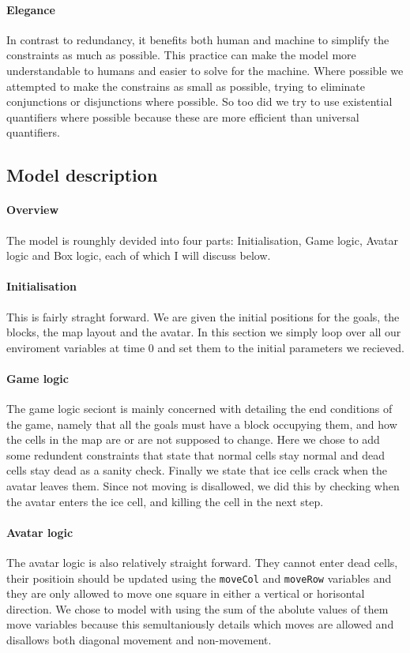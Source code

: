 \documentclass[british]{article}
\newcommand{\code}[1]{\texttt{#1}}
\begin{document}
\paragraph{Elegance} In contrast to redundancy, it benefits both human and machine to simplify the constraints as much as possible. This practice can make the model more understandable to humans and easier to solve for the machine. Where possible we attempted to make the constrains as small as possible, trying to eliminate conjunctions or disjunctions where possible. So too did we try to use existential quantifiers where possible because these are more efficient than universal quantifiers. 

\subsection{Model description}
\paragraph{Overview} The model is rounghly devided into four parts: Initialisation, Game logic, Avatar logic and Box logic, each of which I will discuss below. 

\paragraph{Initialisation} This is fairly straght forward. We are given the initial positions for the goals, the blocks, the map layout and the avatar. In this section we simply loop over all our enviroment variables at time 0 and set them to the initial parameters we recieved. 

\paragraph{Game logic} The game logic seciont is mainly concerned with detailing the end conditions of the game, namely that all the goals must have a block occupying them, and how the cells in the map are or are not supposed to change. Here we chose to add some redundent constraints that state that normal cells stay normal and dead cells stay dead as a sanity check. Finally we state that ice cells crack when the avatar leaves them. Since not moving is disallowed, we did this by checking when the avatar enters the ice cell, and killing the cell in the next step.

\paragraph{Avatar logic} The avatar logic is also relatively straight forward. They cannot enter dead cells, their positioin should be updated using the \code{moveCol} and \code{moveRow} variables and they are only allowed to move one square in either a vertical or horisontal direction. We chose to model with using the sum of the abolute values of them move variables because this semultaniously details which moves are allowed and disallows both diagonal movement and non-movement. 
\end{document}
